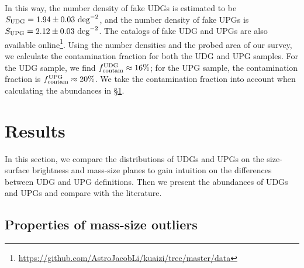 \documentclass[twocolumn,astrosymb,twocolappendix]{aastex631}
\begin{document}
\begin{CJK*}{UTF8}{gbsn}
In this way, the number density of fake UDGs is estimated to be $S_{\rm UDG} = 1.94\pm0.03\ \mathrm{deg}^{-2}$, and the number density of fake UPGs is $S_{\rm UPG} = 2.12\pm0.03\ \mathrm{deg}^{-2}$. The catalogs of fake UDG and UPGs are also available online\footnote{\url{https://github.com/AstroJacobLi/kuaizi/tree/master/data}}. Using the number densities and the probed area of our survey, we calculate the contamination fraction for both the UDG and UPG samples. For the UDG sample, we find $f_{\rm contam}^{\rm UDG} \approx 16\%$; for the UPG sample, the contamination fraction is $f_{\rm contam}^{\rm UPG} \approx 20\%$. We take the contamination fraction into account when calculating the abundances in \S\ref{sec:results}.



\section{Results}\label{sec:results}
In this section, we compare the distributions of UDGs and UPGs on the size-surface brightness and mass-size planes to gain intuition on the differences between UDG and UPG definitions. Then we present the abundances of UDGs and UPGs and compare with the literature. 

\subsection{Properties of mass-size outliers}\label{sec:mass-size}


\end{CJK*}
\end{document}
